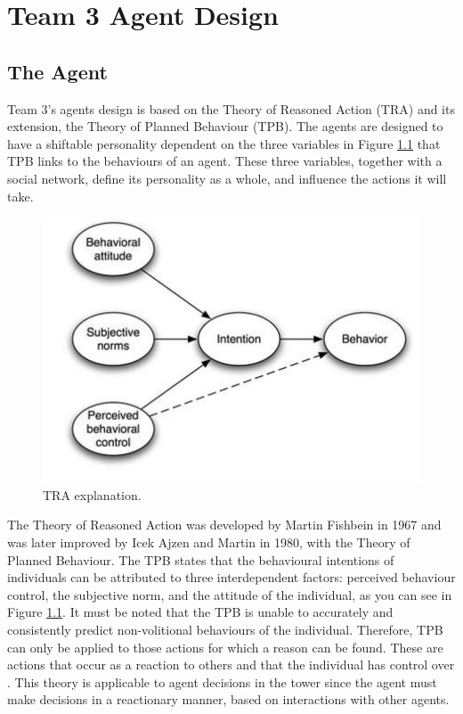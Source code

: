\chapter{Team 3 Agent Design}\label{team_3_agent_design}

\section{The Agent}\label{sec:the_agent}
Team 3’s agents design is based on the Theory of Reasoned Action (TRA) and its extension, the Theory of Planned Behaviour (TPB). The agents are designed to have a shiftable personality dependent on the three variables in Figure \ref{fig:TRA-diagram} that TPB  \cite{AJZEN1991179} links to the behaviours of an agent. These three variables, together with a social network, define its personality as a whole, \cite{victor} and influence the actions it will take.
\begin{figure}[htb]
    \centering
    \includegraphics[width=0.5\linewidth]{005_team_3_agent_design/images/image1.jpg}
    \caption{TRA explanation.}
    \label{fig:TRA-diagram}
\end{figure}
The Theory of Reasoned Action was developed by Martin Fishbein in 1967 and was later improved by Icek Ajzen and Martin in 1980, with the Theory of Planned Behaviour. The TPB states that the behavioural intentions of individuals can be attributed to three interdependent factors: perceived behaviour control, the subjective norm, and the attitude of the individual, as you can see in Figure \ref{fig:TRA-diagram}. It must be noted that the TPB is unable to accurately and consistently predict non-volitional behaviours of the individual. Therefore, TPB can only be applied to those actions for which a reason can be found. These are actions that occur as a reaction to others and that the individual has control over \cite{TRA}. This theory is applicable to agent decisions in the tower since the agent must make decisions in a reactionary manner, based on interactions with other agents.\par 
